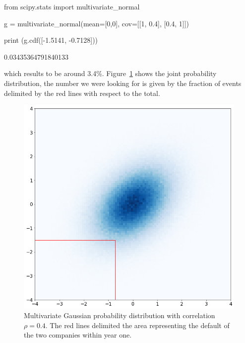 \begin{solution}
\begin{ipython}
from scipy.stats import multivariate_normal

g = multivariate_normal(mean=[0,0],
                        cov=[[1, 0.4],
                             [0.4, 1]])

print (g.cdf([-1.5141, -0.7128]))
\end{ipython}
\begin{ioutput}
0.03435364791840133
\end{ioutput}
\noindent
which results to be around 3.4\%. Figure~\ref{fig:copula_no_marginals} shows the joint probability distribution, the number we were looking for is given by the fraction of events delimited by the red lines with respect to the total.

\begin{figure}[htbp]
\centering
\includegraphics[width=0.5\linewidth]{figures/copula_no_marginals}
\caption{Multivariate Gaussian probability distribution with correlation $\rho=0.4$. The red lines delimited the area representing the default of the two companies within year one.}
\label{fig:copula_no_marginals}
\end{figure}
\end{solution}